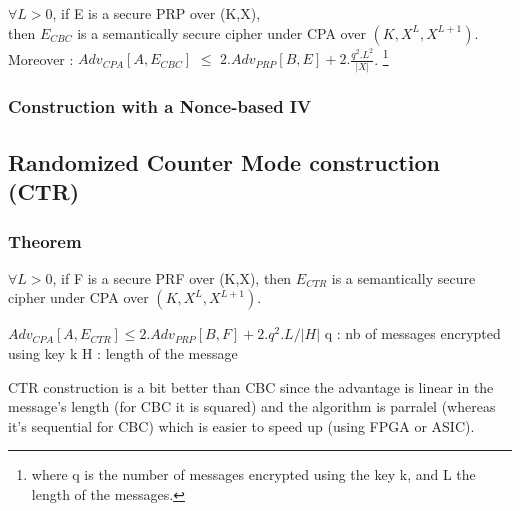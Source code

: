 \begin{mytheorem}
   $\forall L>0$, if E is a secure PRP over (K,X), \\
   then $E_{CBC}$ is a semantically secure cipher under CPA over $(K,X^L,X^{L+1})$. \\
 	Moreover : $Adv_{CPA}[A,E_{CBC}]$  $\leq$ $ 2.Adv_{PRP}[B,E] + 2.\frac{q^2.L^2}{|X|} $. \footnote{where q is the number of messages encrypted using the key k, and L the length of the messages.}
\end{mytheorem}


\subsubsection{Construction with a Nonce-based IV}

\subsection{Randomized Counter Mode construction (CTR)}


\subsubsection{Theorem}

$\forall L>0$, if F is a secure PRF over (K,X), then $E_{CTR}$ is a semantically secure cipher under CPA over $(K,X^L,X^{L+1})$.

$Adv_{CPA}[A,E_{CTR}] \leq 2.Adv_{PRP}[B,F] + 2.q^2.L/|H| $
q : nb of messages encrypted using key k
H : length of the message

CTR construction is a bit better than CBC since the advantage is linear in the message's length (for CBC it is squared) and the algorithm is parralel (whereas it's sequential for CBC) which is easier to speed up (using FPGA or ASIC).
